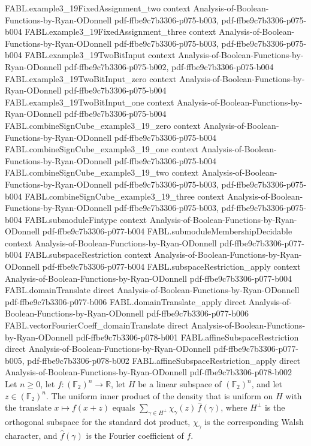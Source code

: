 \begin{theorem}
\proofstep
  {FABL.example3_19FixedAssignment_two}
  {context}
  {Analysis-of-Boolean-Functions-by-Ryan-ODonnell}
  {pdf-ffbe9c7b3306-p075-b003,
    pdf-ffbe9c7b3306-p075-b004}
\proofstep
  {FABL.example3_19FixedAssignment_three}
  {context}
  {Analysis-of-Boolean-Functions-by-Ryan-ODonnell}
  {pdf-ffbe9c7b3306-p075-b003,
    pdf-ffbe9c7b3306-p075-b004}
\proofstep
  {FABL.example3_19TwoBitInput}
  {context}
  {Analysis-of-Boolean-Functions-by-Ryan-ODonnell}
  {pdf-ffbe9c7b3306-p075-b002,
    pdf-ffbe9c7b3306-p075-b004}
\proofstep
  {FABL.example3_19TwoBitInput_zero}
  {context}
  {Analysis-of-Boolean-Functions-by-Ryan-ODonnell}
  {pdf-ffbe9c7b3306-p075-b004}
\proofstep
  {FABL.example3_19TwoBitInput_one}
  {context}
  {Analysis-of-Boolean-Functions-by-Ryan-ODonnell}
  {pdf-ffbe9c7b3306-p075-b004}
\proofstep
  {FABL.combineSignCube_example3_19_zero}
  {context}
  {Analysis-of-Boolean-Functions-by-Ryan-ODonnell}
  {pdf-ffbe9c7b3306-p075-b004}
\proofstep
  {FABL.combineSignCube_example3_19_one}
  {context}
  {Analysis-of-Boolean-Functions-by-Ryan-ODonnell}
  {pdf-ffbe9c7b3306-p075-b004}
\proofstep
  {FABL.combineSignCube_example3_19_two}
  {context}
  {Analysis-of-Boolean-Functions-by-Ryan-ODonnell}
  {pdf-ffbe9c7b3306-p075-b003,
    pdf-ffbe9c7b3306-p075-b004}
\proofstep
  {FABL.combineSignCube_example3_19_three}
  {context}
  {Analysis-of-Boolean-Functions-by-Ryan-ODonnell}
  {pdf-ffbe9c7b3306-p075-b003,
    pdf-ffbe9c7b3306-p075-b004}
\proofstep
  {FABL.submoduleFintype}
  {context}
  {Analysis-of-Boolean-Functions-by-Ryan-ODonnell}
  {pdf-ffbe9c7b3306-p077-b004}
\proofstep
  {FABL.submoduleMembershipDecidable}
  {context}
  {Analysis-of-Boolean-Functions-by-Ryan-ODonnell}
  {pdf-ffbe9c7b3306-p077-b004}
\proofstep
  {FABL.subspaceRestriction}
  {context}
  {Analysis-of-Boolean-Functions-by-Ryan-ODonnell}
  {pdf-ffbe9c7b3306-p077-b004}
\proofstep
  {FABL.subspaceRestriction_apply}
  {context}
  {Analysis-of-Boolean-Functions-by-Ryan-ODonnell}
  {pdf-ffbe9c7b3306-p077-b004}
\proofstep
  {FABL.domainTranslate}
  {direct}
  {Analysis-of-Boolean-Functions-by-Ryan-ODonnell}
  {pdf-ffbe9c7b3306-p077-b006}
\proofstep
  {FABL.domainTranslate_apply}
  {direct}
  {Analysis-of-Boolean-Functions-by-Ryan-ODonnell}
  {pdf-ffbe9c7b3306-p077-b006}
\proofstep
  {FABL.vectorFourierCoeff_domainTranslate}
  {direct}
  {Analysis-of-Boolean-Functions-by-Ryan-ODonnell}
  {pdf-ffbe9c7b3306-p078-b001}
\proofstep
  {FABL.affineSubspaceRestriction}
  {direct}
  {Analysis-of-Boolean-Functions-by-Ryan-ODonnell}
  {pdf-ffbe9c7b3306-p077-b005,
    pdf-ffbe9c7b3306-p078-b002}
\proofstep
  {FABL.affineSubspaceRestriction_apply}
  {direct}
  {Analysis-of-Boolean-Functions-by-Ryan-ODonnell}
  {pdf-ffbe9c7b3306-p078-b002}
Let $n\geq0$, let $f:(\mathbb F_2)^n\to\mathbb R$, let $H$ be a linear subspace of
$(\mathbb F_2)^n$, and let $z\in(\mathbb F_2)^n$. The uniform inner product of the
density that is uniform on $H$ with the translate $x\mapsto f(x+z)$ equals
$\sum_{\gamma\in H^\perp}\chi_\gamma(z)\,\widehat f(\gamma)$, where $H^\perp$ is the
orthogonal subspace for the standard dot product, $\chi_\gamma$ is the corresponding
Walsh character, and $\widehat f(\gamma)$ is the Fourier coefficient of $f$.
\end{theorem}

